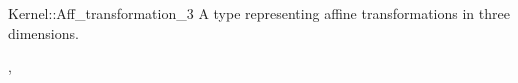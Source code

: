\begin{ccRefConcept}{Kernel::Aff_transformation_3}
\ccDefinition
A type representing affine transformations in three dimensions.

\ccRefines
{},

\ccSeeAlso
{}

\end{ccRefConcept}         

